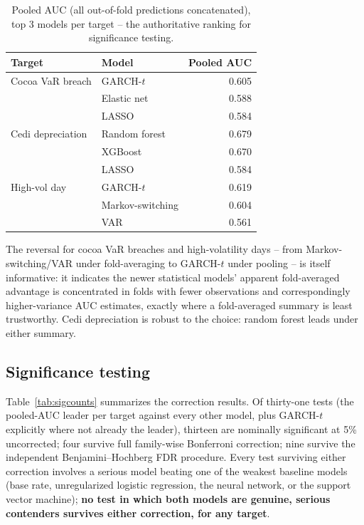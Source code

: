 \documentclass[final,3p,times,authoryear]{elsarticle}
\begin{document}
\begin{table}[htbp]
\centering
\caption{Pooled AUC (all out-of-fold predictions concatenated), top 3 models per target -- the authoritative ranking for significance testing.}
\label{tab:pooled}
\small
\begin{tabular}{llr}
\toprule
Target & Model & Pooled AUC \\
\midrule
Cocoa VaR breach     & GARCH-$t$         & 0.605 \\
                     & Elastic net       & 0.588 \\
                     & LASSO             & 0.584 \\
Cedi depreciation    & Random forest     & 0.679 \\
                     & XGBoost           & 0.670 \\
                     & LASSO             & 0.584 \\
High-vol day         & GARCH-$t$         & 0.619 \\
                     & Markov-switching & 0.604 \\
                     & VAR               & 0.561 \\
\bottomrule
\end{tabular}
\end{table}

The reversal for cocoa VaR breaches and high-volatility days -- from
Markov-switching/VAR under fold-averaging to GARCH-$t$ under pooling --
is itself informative: it indicates the newer statistical models'
apparent fold-averaged advantage is concentrated in folds with fewer
observations and correspondingly higher-variance AUC estimates, exactly
where a fold-averaged summary is least trustworthy. Cedi depreciation is
robust to the choice: random forest leads under either summary.

\subsection{Significance testing}
\label{sec:sig-results}

Table~\ref{tab:sigcounts} summarizes the correction results. Of
thirty-one tests (the pooled-AUC leader per target against every other
model, plus GARCH-$t$ explicitly where not already the leader), thirteen
are nominally significant at 5\% uncorrected; four survive full
family-wise Bonferroni correction; nine survive the independent
Benjamini--Hochberg FDR procedure. Every test surviving either
correction involves a serious model beating one of the weakest baseline
models (base rate, unregularized logistic regression, the neural
network, or the support vector machine); \textbf{no test in which both
models are genuine, serious contenders survives either correction, for
any target}.
\end{document}
